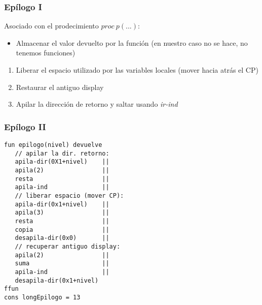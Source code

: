 \documentclass[hyperref={pdfpagelabels=false},tree-dvips,compress]{beamer}
\begin{document}
\begin{frame}[fragile]
\frametitle{Epílogo I}

Asociado con el prodecimiento $proc \ p(...)$:
\begin{itemize}[<+->]
	\item Almacenar el valor devuelto por la función (en nuestro caso no se hace, no tenemos funciones)
\end{itemize}
\begin{enumerate}[<+->]
    \item Liberar el espacio utilizado por las variables locales (mover hacia atrás el CP)
    \item Restaurar el antiguo display
    \item Apilar la dirección de retorno y saltar usando \emph{ir-ind}
\end{enumerate}

\end{frame}
\begin{frame}[fragile]
\frametitle{Epílogo II}
\begin{lstlisting}[style=codigoMP,basicstyle=\scriptsize\ttfamily]
fun epilogo(nivel) devuelve
   // apilar la dir. retorno:
   apila-dir(0X1+nivel)    ||
   apila(2)                ||
   resta                   ||
   apila-ind               ||
   // liberar espacio (mover CP):
   apila-dir(0x1+nivel)    ||
   apila(3)                ||
   resta                   ||
   copia                   ||
   desapila-dir(0x0)       ||
   // recuperar antiguo display:
   apila(2)                ||
   suma                    ||
   apila-ind               ||
   desapila-dir(0x1+nivel)
ffun
cons longEpilogo = 13
\end{lstlisting}

\end{frame}
\end{document}
